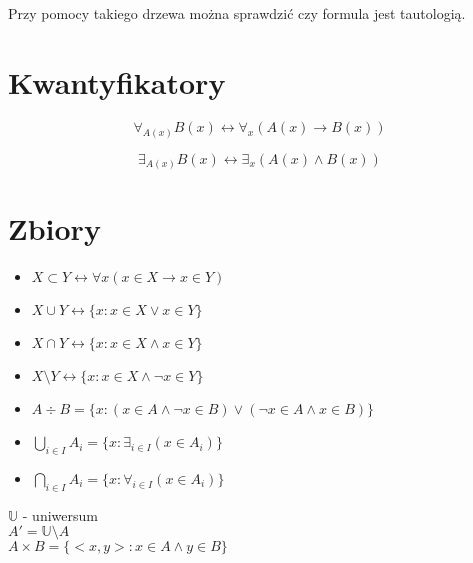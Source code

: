 \documentclass{../notatki}
\begin{document}
Przy pomocy takiego drzewa można sprawdzić czy formula jest tautologią.

\section{Kwantyfikatory}

$$
\forall_{A(x)} B(x) \leftrightarrow \forall_{x} (A(x) \rightarrow B(x))
$$

$$
\exists_{A(x)} B(x) \leftrightarrow \exists_{x} (A(x) \land B(x))
$$

\section{Zbiory}

\begin{itemize}
  \item $X \subset Y \leftrightarrow \forall x (x \in X \rightarrow x \in Y)$
  \item $X \cup Y \leftrightarrow \{x : x \in X \lor x \in Y\}$
  \item $X \cap Y \leftrightarrow \{x : x \in X \land x \in Y\}$
  \item $X \setminus Y \leftrightarrow \{x : x \in X \land \neg x \in Y\}$
  \item $A \div B = \{x : (x \in A \land \neg x \in B) \lor (\neg x
    \in A \land x \in B)\}$
  \item $\bigcup_{i \in I} A_i = \{x: \exists_{i \in I}(x \in A_i)\}$
  \item $\bigcap_{i \in I} A_i = \{x: \forall_{i \in I}(x \in A_i)\}$
\end{itemize}
$\mathbb{U}$ - uniwersum \\
$A' = \mathbb{U} \setminus A$ \\
$A \times B = \{<x, y>: x \in A \land y \in B\}$
\end{document}
